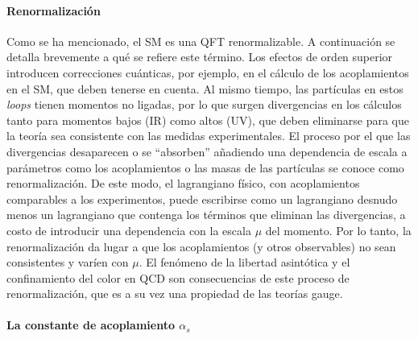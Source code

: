 \paragraph{Renormalización}

Como se ha mencionado, el \ac{SM} es una \ac{QFT} renormalizable. A continuación se detalla brevemente a qué se refiere este término. Los efectos de orden superior introducen correcciones cuánticas, por ejemplo, en el cálculo de los acoplamientos en el \ac{SM}, que deben tenerse en cuenta. Al mismo tiempo, las partículas en estos \textit{loops} tienen momentos no ligadas, por lo que surgen divergencias en los cálculos tanto para momentos bajos (\ac{IR}) como altos (\ac{UV}), que deben eliminarse para que la teoría sea consistente con las medidas experimentales. El proceso por el que las divergencias desaparecen o se \enquote{absorben} añadiendo una dependencia de escala a parámetros como los acoplamientos o las masas de las partículas se conoce como renormalización. De este modo, el lagrangiano físico, con acoplamientos comparables a los experimentos, puede escribirse como un lagrangiano desnudo menos un lagrangiano que contenga los términos que eliminan las divergencias, a costo de introducir una dependencia con la escala \(\mu\) del momento. Por lo tanto, la renormalización da lugar a que los acoplamientos (y otros observables) no sean consistentes y varíen con \(\mu\). El fenómeno de la libertad asintótica y el confinamiento del color en \ac{QCD} son consecuencias de este proceso de renormalización, que es a su vez una propiedad de las teorías gauge.

\paragraph{La constante de acoplamiento \(\alpha_s\)}

